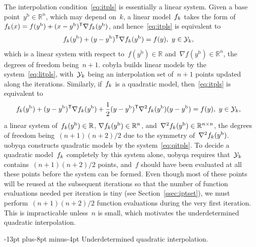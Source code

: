 \documentclass[
    smallextended,  %
    final,          %
]{svjour3}
\makeatletter
\newcommand{\R}{\mathbb{R}}
\newcommand{\T}{\mathsf{T}}
\newcommand{\base}{{\text{b}}}
\newcommand{\objm}[1][k]{\obj\ifthenelse{\equal{#1}{}}{}{_{#1}}}
\newcommand{\obj}{f}
\newcommand{\xpt}[1][k]{\mathcal{Y}\ifthenelse{\equal{#1}{}}{}{_{#1}}}
\def\paragraph{\@startsection{paragraph}{4}{\z@}%
    {-13pt plus-8pt minus-4pt}{\z@}
    {\sffamily\normalsize\bfseries}}
\newcommand{\modified}[1]{\texorpdfstring{{\color{RoyalBlue}#1}}{#1}}
\makeatother
\begin{document}
The interpolation condition~\eqref{eq:itpls} is essentially a linear system.
Given a base point~$y^{\base}\in \R^n$, which may depend on~$k$, a linear model~$\objm$ takes the form of~$\objm(x) = \obj(y^{\base}) + (x - y^{\base})^{\T} \nabla \objm(y^{\base})$, and hence~\eqref{eq:itpls} is equivalent to
\begin{equation}
    \label{eq:litpls}
    \objm(y^{\base}) + (y -y^{\base})^{\T} \nabla \objm(y^{\base}) = \obj(y), ~ y \in \xpt,
\end{equation}
which is a linear system with respect to~$\obj(y^\base) \in \R$ and~$\nabla \obj(y^\base) \in \R^n$, the degrees of freedom being~$n + 1$.
\Gls{cobyla} builds linear models by the system~\eqref{eq:litpls}, with~$\xpt$ being an interpolation set of~$n+1$ points updated along the iterations.
Similarly, if~$\objm$ is a quadratic model, then~\eqref{eq:itpls} is equivalent to
\begin{equation}
    \label{eq:qitpls}
    \objm(y^{\base}) + (y -y^{\base})^{\T} \nabla \objm(y^{\base}) + \frac{1}{2}(y-y^{\base})^{\T} \nabla^2 \objm(y^{\base}) (y-y^{\base}) = \obj(y), ~ y \in \xpt,
\end{equation}
a linear system \modified{of}~$\objm(y^\base) \in \R$, $\nabla \objm(y^\base) \in \R^n$, and~$\nabla^2 \objm(y^{\base}) \in \R^{n \times n}$, the degrees of freedom being~$(n + 1)(n + 2) / 2$ due to the symmetry of~$\nabla^2 \objm(y^\base)$.
\Gls{uobyqa} constructs quadratic models by the system~\eqref{eq:qitpls}.
To decide a quadratic model~$\objm$ completely by this system alone, \gls{uobyqa} requires that~$\xpt$ contains~$(n+1)(n+2)/2$ points, and~$f$ should have been evaluated at all these points before the system can be formed.
Even though most of these points will be reused at the subsequent iterations so that the number of function evaluations needed per iteration is tiny (see Section~\ref{ssec:iptset}), we must perform~$(n + 1)(n + 2) / 2$ function evaluations during the very first iteration.
This is impracticable unless~$n$ is small, which motivates the underdetermined quadratic interpolation.

\paragraph{Underdetermined quadratic interpolation.}
\end{document}
